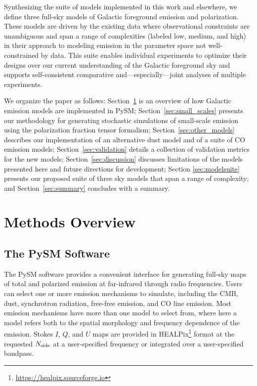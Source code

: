 \documentclass[twocolumn]{aastex631}
\begin{document}
Synthesizing the suite of models implemented in this work and elsewhere, we define three full-sky models of Galactic foreground emission and polarization. These models are driven by the existing data where observational constraints are unambiguous and span a range of complexities (labeled low, medium, and high) in their approach to modeling emission in the parameter space not well-constrained by data. This suite enables individual experiments to optimize their designs over our current understanding of the Galactic foreground sky and supports self-consistent comparative and---especially---joint analyses of multiple experiments.

We organize the paper as follows: Section~\ref{sec:methods} is an overview of how Galactic emission models are implemented in PySM; Section~\ref{sec:small_scales} presents our methodology for generating stochastic simulations of small-scale emission using the polarization fraction tensor formalism; Section~\ref{sec:other_models} describes our implementation of an alternative dust model and of a suite of CO emission models; Section~\ref{sec:validation} details a collection of validation metrics for the new models; Section~\ref{sec:discussion} discusses limitations of the models presented here and future directions for development; Section \ref{sec:modelsuite} presents our proposed suite of three sky models that span a range of complexity; and Section~\ref{sec:summary} concludes with a summary.

\section{Methods Overview} \label{sec:methods}

\subsection{The PySM Software}
The PySM software provides a convenient interface for generating full-sky maps of total and polarized emission at far-infrared through radio frequencies. Users can select one or more emission mechanisms to simulate, including the CMB, dust, synchrotron radiation, free-free emission, and CO line emission. Most emission mechanisms have more than one model to select from, where here a model refers both to the spatial morphology and frequency dependence of the emission. Stokes $I$, $Q$, and $U$ maps are provided in HEALPix\footnote{\url{https://healpix.sourceforge.io}}  \citep{Gorski:2005} format at the requested $N_{\rm side}$ at a user-specified frequency or integrated over a user-specified bandpass.
\end{document}
